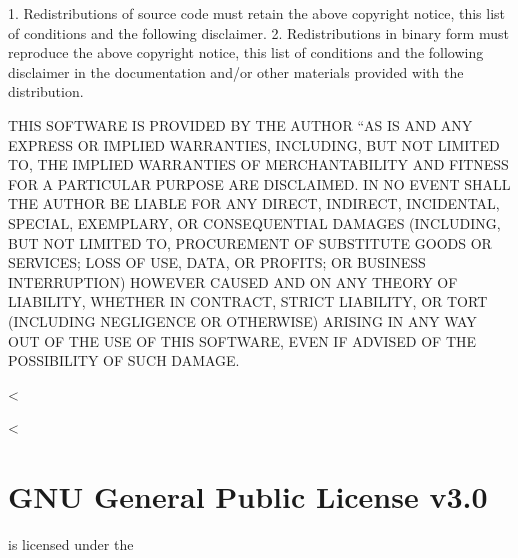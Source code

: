 \documentclass[letterpaper,10pt,english]{sphinxmanual}
\begin{document}
\begin{sphinxVerbatim}[commandchars=\\\{\}]
 1. Redistributions of source code must retain the above copyright
    notice, this list of conditions and the following disclaimer.
 2. Redistributions in binary form must reproduce the above copyright
    notice, this list of conditions and the following disclaimer in
    the documentation and/or other materials provided with the
    distribution.

THIS SOFTWARE IS PROVIDED BY THE AUTHOR ``AS IS\PYGZsq{}\PYGZsq{} AND ANY EXPRESS OR
IMPLIED WARRANTIES, INCLUDING, BUT NOT LIMITED TO, THE IMPLIED
WARRANTIES OF MERCHANTABILITY AND FITNESS FOR A PARTICULAR PURPOSE ARE
DISCLAIMED. IN NO EVENT SHALL THE AUTHOR BE LIABLE FOR ANY DIRECT,
INDIRECT, INCIDENTAL, SPECIAL, EXEMPLARY, OR CONSEQUENTIAL DAMAGES
(INCLUDING, BUT NOT LIMITED TO, PROCUREMENT OF SUBSTITUTE GOODS OR
SERVICES; LOSS OF USE, DATA, OR PROFITS; OR BUSINESS INTERRUPTION)
HOWEVER CAUSED AND ON ANY THEORY OF LIABILITY, WHETHER IN CONTRACT,
STRICT LIABILITY, OR TORT (INCLUDING NEGLIGENCE OR OTHERWISE) ARISING
IN ANY WAY OUT OF THE USE OF THIS SOFTWARE, EVEN IF ADVISED OF THE
POSSIBILITY OF SUCH DAMAGE.

\PYGZhy{}\PYGZhy{}\PYGZhy{}\PYGZhy{}\PYGZhy{}\PYGZhy{}\PYGZhy{}\PYGZhy{}\PYGZhy{}\PYGZhy{}\PYGZhy{}\PYGZhy{}\PYGZhy{}\PYGZhy{}\PYGZhy{}\PYGZhy{}\PYGZhy{}\PYGZhy{}\PYGZhy{}\PYGZhy{}\PYGZhy{}\PYGZhy{}\PYGZhy{}\PYGZhy{}\PYGZhy{}\PYGZhy{}\PYGZhy{}\PYGZhy{}\PYGZhy{}\PYGZhy{}\PYGZhy{}\PYGZhy{}\PYGZhy{}\PYGZhy{}\PYGZhy{}\PYGZhy{}\PYGZhy{}\PYGZhy{}\PYGZhy{}\PYGZhy{}\PYGZhy{}\PYGZhy{}\PYGZhy{}\PYGZhy{}\PYGZhy{}\PYGZhy{}\PYGZhy{}\PYGZhy{}\PYGZhy{}\PYGZhy{}\PYGZhy{}\PYGZhy{}\PYGZhy{}\PYGZhy{}\PYGZhy{}\PYGZhy{}\PYGZhy{}\PYGZhy{}\PYGZhy{}\PYGZhy{}\PYGZhy{}\PYGZhy{}\PYGZhy{}\PYGZhy{}\PYGZhy{}\PYGZhy{}\PYGZhy{}\PYGZhy{}\PYGZhy{}\PYGZhy{}\PYGZhy{}\PYGZhy{}\PYGZhy{}\PYGZhy{}\PYGZhy{}\PYGZhy{}\PYGZhy{}\PYGZhy{}\PYGZhy{}
\end{sphinxVerbatim}


<%
\sphinxstepscope

<%
\chapter{GNU General Public License v3.0}
\label{\detokenize{examples/gpl-3.0:gnu-general-public-license-v3-0}}\label{\detokenize{examples/gpl-3.0::doc}}
 is licensed under the 
\end{document}
